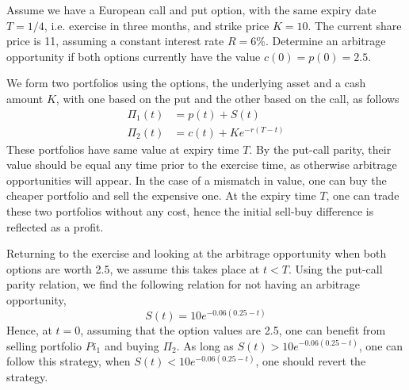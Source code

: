 \documentclass[12pt,a4paper]{exam}
\begin{document}
\begin{questions}
\begin{solution}
\begin{solution}
\begin{solution}
\begin{enumerate}[label=(\alph*),font=\itshape]
\end{enumerate}
\end{solution}

\question Assume we have a European call and put option, with the same expiry date $T=1/4$, i.e. exercise in three months, and strike price $K=10$. The current share price is 11, assuming a constant interest rate $R=6\%$. Determine an arbitrage opportunity if both options currently have the value $c(0)=p(0)=2.5$.

\fillwithlines{3cm}
\begin{solution}
We form two portfolios using the options, the underlying asset and a cash amount $K$, with one based on the put and the other based on the call, as follows
\begin{equation*}
\begin{aligned}
\Pi_1(t) &= p(t) + S(t)\\
\Pi_2(t) &= c(t) + Ke^{-r(T-t)}
\end{aligned}
\end{equation*}
These portfolios have same value at expiry time $T$. By the put-call parity, their value should be equal any time prior to the exercise time, as otherwise arbitrage opportunities will appear. In the case of a mismatch in value, one can buy the cheaper portfolio and sell the expensive one. At the expiry time $T$, one can trade these two portfolios without any cost, hence the initial sell-buy difference is reflected as a profit. 

Returning to the exercise and looking at the arbitrage opportunity when both options are worth 2.5, we assume this takes place at $t < T$. Using the put-call parity relation, we find the following relation for not having an arbitrage opportunity, 
\begin{equation*}
S(t) = 10e^{-0.06(0.25-t)}
\end{equation*}
Hence, at $t = 0$, assuming that the option values are 2.5, one can benefit from selling portfolio $Pi_1$ and buying $\Pi_2$. As long as $S(t) > 10 e^{
-0.06(0.25-t)}$, one can follow this strategy, when $S(t) < 10 e^{-0.06(0.25-t)}$, one should revert the strategy.
\end{solution}


\end{solution}
\end{solution}
\end{questions}
\end{document}
